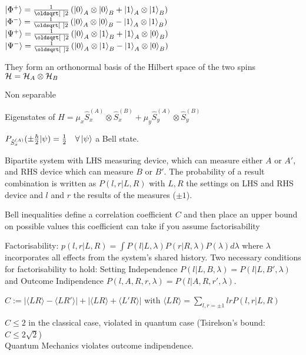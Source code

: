 \begin{squishlist}
    \item $\ket{\Phi^+} = \frac{1}{\sqrt{2}} \left( \ket{0}_A \otimes \ket{0}_B + \ket{1}_A \otimes \ket{1}_B\right)$ \\
          $\ket{\Phi^-} = \frac{1}{\sqrt{2}} \left( \ket{0}_A \otimes \ket{0}_B - \ket{1}_A \otimes \ket{1}_B\right)$ \\
          $\ket{\Psi^+} = \frac{1}{\sqrt{2}} \left( \ket{0}_A \otimes \ket{1}_B + \ket{1}_A \otimes \ket{0}_B\right)$ \\
          $\ket{\Psi^-} = \frac{1}{\sqrt{2}} \left( \ket{0}_A \otimes \ket{1}_B - \ket{1}_A \otimes \ket{0}_B\right)$
    \item They form an orthonormal basis of the Hilbert space of the two spins $\mathcal{H} = \mathcal{H}_A \otimes \mathcal{H}_B$
    \item Non separable
    \item Eigenstates of $\hat{H} = \mu_x \hat{S}_x^{(A)} \otimes \hat{S}_x^{(B)} + \mu_y \hat{S}_y^{(A)} \otimes \hat{S}_y^{(B)}$
    \item $P_{\hat{S}_x^{(A)}}(\pm \frac{\hbar}{2} | \psi) = \frac{1}{2} \quad \forall \ket{\psi} $ a Bell state. 
\end{squishlist}




\begin{squishlist}
    \item Bipartite system with LHS measuring device, which can measure either $A$ or $A'$, and RHS device which can measure $B$ or $B'$.
    The probability of a result combination is written as $P(l,r|L,R)$ with $L,R$ the settings on LHS and RHS device and $l$ and $r$ the results of the measures ($\pm 1$).
    \item Bell inequalities define a correlation coefficient $C$ and then place an upper bound on possible values this coefficient can take if you assume factorisability
    \item {Factorisability}: $p(l,r|L,R) = \int P(l|L,\lambda) P(r|R,\lambda) P(\lambda) d\lambda$ where $\lambda$ incorporates all effects from the system's shared history.
    Two necessary conditions for factorisability to hold: Setting Independence $P(l|L,B,\lambda) = P(l|L,B',\lambda)$ and Outcome Indipendence $P(l,A,R,r,\lambda) = P(l|A,R,r',\lambda)$.
    \item $C:= |\langle LR \rangle - \langle LR'\rangle  | + |\langle LR\rangle + \langle L'R \rangle |$ with $\langle LR \rangle = \sum_{l,r=\pm 1}lr P(l,r|L,R)$
    \item $C \leq 2$ in the classical case, violated in quantum case (Tsirelson's bound: $C \leq 2\sqrt{2}$) \\ Quantum Mechanics violates outcome indipendence.
\end{squishlist}


